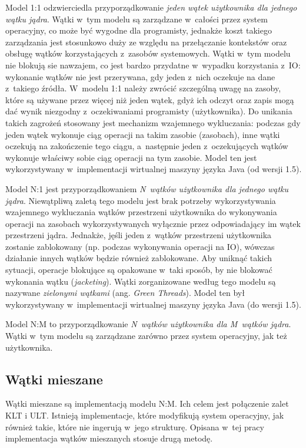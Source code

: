 %
\indent
	Model 1:1 odzwierciedla przyporządkowanie \emph{jeden wątek użytkownika dla jednego wątku jądra}.
	Wątki w~tym modelu są zarządzane w~całości przez system operacyjny, co może być wygodne dla programisty,
	jednakże koszt takiego zarządzania jest stosunkowo duży ze względu na przełączanie kontekstów oraz obsługę
	wątków korzystających z~zasobów systemowych. Wątki w~tym modelu nie blokują sie nawzajem, co jest bardzo przydatne
	w~wypadku korzystania z~IO: wykonanie wątków nie jest przerywana, gdy jeden z~nich oczekuje na dane z~takiego źródła.
	W~modelu 1:1 należy zwrócić szczególną uwagę na zasoby, które
	są używane przez więcej niż jeden wątek, gdyż ich odczyt oraz zapis mogą dać wynik niezgodny z~oczekiwaniami
	programisty (użytkownika). Do unikania takich zagrożeń stosowany jest mechanizm wzajemnego wykluczania: podczas gdy jeden
	wątek wykonuje ciąg operacji na takim zasobie (zasobach), inne wątki oczekują na zakończenie tego ciągu, a~następnie 
	jeden z~oczekujących wątków wykonuje właściwy sobie ciąg operacji na tym zasobie.
	Model ten jest wykorzystywany w~implementacji wirtualnej maszyny języka Java (od wersji 1.5).
\par
%
\indent
	Model N:1 jest przyporządkowaniem \emph{N~wątków użytkownika dla jednego wątku jądra}. Niewątpliwą zaletą tego modelu
	jest brak potrzeby wykorzystywania wzajemnego wykluczania wątków przestrzeni użytkownika do wykonywania operacji
	na zasobach wykorzystywanych wyłącznie przez odpowiadający im wątek przestrzeni jądra. Jednakże, jęśli jeden z~wątków przestrzeni
	użytkownika zostanie zablokowany (np. podczas wykonywania operacji na IO), wówczas działanie innych wątków będzie również zablokowane.
	Aby uniknąć takich sytuacji, operacje blokujące są opakowane w~taki sposób, by nie blokować wykonania wątku (\emph{jacketing}).
	Wątki zorganizowane według tego modelu są nazywane \emph{zielonymi wątkami} (ang. \emph{Green Threads}).
	Model ten był wykorzystywany w~implementacji wirtualnej maszyny języka Java (do wersji 1.5).
\par
%
\indent
	Model N:M to przyporządkowanie \emph{N~wątków użytkownika dla M~wątków jądra}. Wątki w~tym modelu są zarządzane zarówno 
	przez system operacyjny, jak też użytkownika.
\par

\subsection{Wątki mieszane}
%
\indent
	Wątki mieszane są implementacją modelu N:M. Ich celem jest połączenie zalet KLT i ULT. Istnieją implementacje, które
	modyfikują system operacyjny, jak również takie, które nie ingerują w~jego strukturę. Opisana w~tej pracy implementacja
	wątków mieszanych stosuje drugą metodę.
\par
